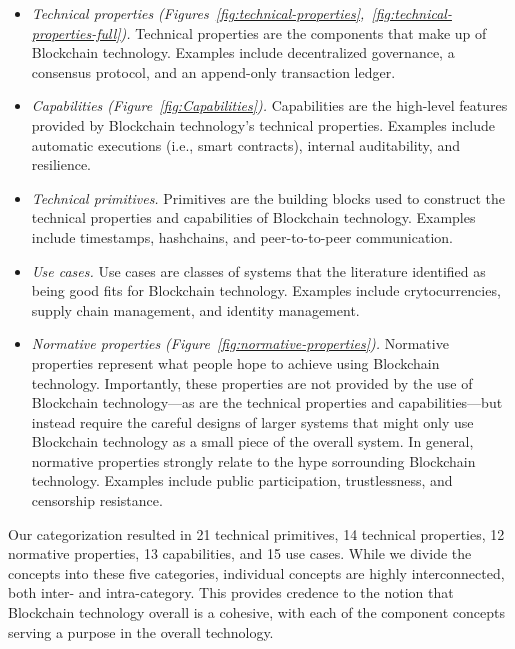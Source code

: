 \begin{itemize}[label=$\blacksquare$]
	\item \emph{Technical properties (Figures~\ref{fig:technical-properties},~\ref{fig:technical-properties-full}).}
	Technical properties are the components that make up of Blockchain technology. Examples include decentralized governance, a consensus protocol, and an append-only transaction ledger.
	
	\item \emph{Capabilities (Figure~\ref{fig:Capabilities}).}
	Capabilities are the high-level features provided by Blockchain technology's technical properties. Examples include automatic executions (i.e., smart contracts), internal auditability, and resilience.
	
	\item \emph{Technical primitives.}
	Primitives are the building blocks used to construct the technical properties and capabilities of Blockchain technology. Examples include timestamps, hashchains, and peer-to-to-peer communication.
	
	\item \emph{Use cases.}
	Use cases are classes of systems that the literature identified as being good fits for Blockchain technology. Examples include crytocurrencies, supply chain management, and identity management.
	
	\item \emph{Normative properties (Figure~\ref{fig:normative-properties}).}
	Normative properties represent what people hope to achieve using Blockchain technology. 
	Importantly, these properties are not provided by the use of Blockchain technology---as are the technical properties and capabilities---but instead require the careful designs of larger systems that might only use Blockchain technology as a small piece of the overall system.
	In general, normative properties strongly relate to the hype sorrounding Blockchain technology.
	Examples include public participation, trustlessness, and censorship resistance.
		
\end{itemize}

Our categorization resulted in 21 technical primitives, 14 technical properties, 12 normative properties, 13 capabilities, and 15 use cases.
While we divide the concepts into these five categories, individual concepts are highly interconnected, both inter- and intra-category. 
This provides credence to the notion that Blockchain technology overall is a cohesive, with each of the component concepts serving a purpose in the overall technology.

